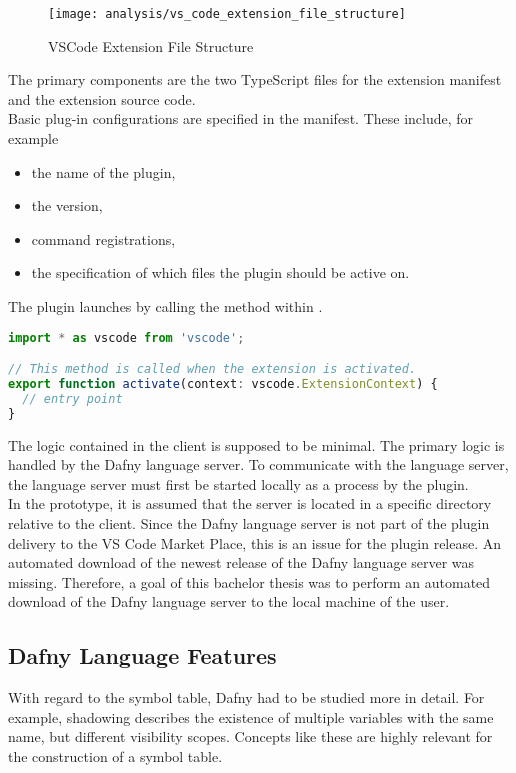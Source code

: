 \begin{figure}[H]
    \centering
    \texttt{[image: analysis/vs\_code\_extension\_file\_structure]}
    \caption{VSCode Extension File Structure}
    \label{fig:vs_code_extension_file_structure}
\end{figure}

The primary components are the two TypeScript files for the extension manifest and the extension source code. \\

Basic plug-in configurations are specified in the manifest.
These include, for example
\begin{itemize}
    \item the name of the plugin,
    \item the version,
    \item command registrations,
    \item the specification of which files the plugin should be active on.
\end{itemize}

The plugin launches by calling the method  within .

\begin{lstlisting}[language=typescript, caption={extension.ts}, captionpos=b, label={lst:extension-file}]
import * as vscode from 'vscode';

// This method is called when the extension is activated.
export function activate(context: vscode.ExtensionContext) {
  // entry point
}
\end{lstlisting}

The logic contained in the client is supposed to be minimal.
The primary logic is handled by the Dafny language server.
To communicate with the language server, the language server must first be started locally as a process by the plugin. \\

In the prototype, it is assumed that the server is located in a specific directory relative to the client.
Since the Dafny language server is not part of the plugin delivery to the VS Code Market Place,
this is an issue for the plugin release.
An automated download of the newest release of the Dafny language server was missing.
Therefore, a goal of this bachelor thesis was to perform an automated download of the Dafny language server to the local machine of the user.


\subsection{Dafny Language Features}
With regard to the symbol table, Dafny had to be studied more in detail.
For example, shadowing describes the existence of multiple variables with the same name, but different visibility scopes.
Concepts like these are highly relevant for the construction of a symbol table. \\

